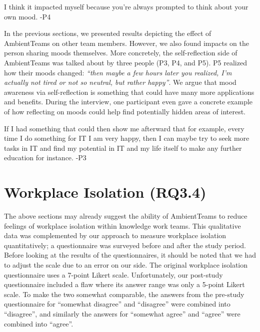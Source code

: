 \begin{displayquote}
    I think it impacted myself because you're always prompted to think about your own mood. -P4
\end{displayquote}

In the previous sections, we presented results depicting the effect of AmbientTeams on other team members. However, we also found impacts on the person sharing moods themselves. More concretely, the self-reflection side of AmbientTeams was talked about by three people (P3, P4, and P5). P5 realized how their moods changed: \textit{\enquote{then maybe a few hours later you realized, I'm actually not tired or not so neutral, but rather happy}}. We argue that mood awareness via self-reflection is something that could have many more applications and benefits. During the interview, one participant even gave a concrete example of how reflecting on moods could help find potentially hidden areas of interest.

\begin{displayquote}
    If I had something that could then show me afterward that for example, every time I do something for IT I am very happy, then I can maybe try to seek more tasks in IT and find my potential in IT and my life itself to make any further education for instance. -P3
\end{displayquote}

\section{Workplace Isolation (RQ3.4)}
\label{section:workplace_isolation}

The above sections may already suggest the ability of AmbientTeams to reduce feelings of workplace isolation within knowledge work teams. This qualitative data was complemented by our approach to measure workplace isolation quantitatively; a questionnaire was surveyed before and after the study period. Before looking at the results of the questionnaires, it should be noted that we had to adjust the scale due to an error on our side. The original workplace isolation questionnaire uses a 7-point Likert scale. Unfortunately, our post-study questionnaire included a flaw where its answer range was only a 5-point Likert scale. To make the two somewhat comparable, the answers from the pre-study questionnaire for \enquote{somewhat disagree} and \enquote{disagree} were combined into \enquote{disagree}, and similarly the answers for \enquote{somewhat agree} and \enquote{agree} were combined into \enquote{agree}.

